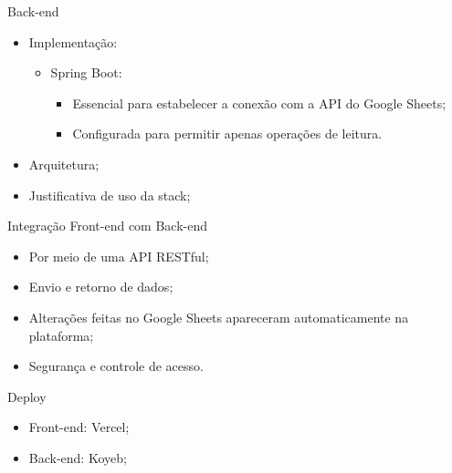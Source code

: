 \begin{frame}{Back-end}
    \begin{itemize}
        \item Implementação: \vspace{0.5cm}
              \begin{itemize}
                  \item Spring Boot: \vspace{0.5cm}
                        \begin{itemize}
                            \item Essencial para estabelecer a conexão com a API do Google Sheets; \vspace{0.5cm}
                            \item Configurada para permitir apenas operações de leitura. \vspace{0.5cm}
                        \end{itemize}
              \end{itemize}
        \item Arquitetura; \vspace{0.5cm}
        \item Justificativa de uso da stack; \vspace{0.5cm}
    \end{itemize}
\end{frame}

\begin{frame}{Integração Front-end com Back-end}
    \begin{itemize}
        \item Por meio de uma API RESTful; \vspace{0.5cm}
        \item Envio e retorno de dados; \vspace{0.5cm}
        \item Alterações feitas no Google Sheets apareceram automaticamente na plataforma; \vspace{0.5cm}
        \item Segurança e controle de acesso. \vspace{0.5cm}
    \end{itemize}
\end{frame}

\begin{frame}{Deploy}
    \begin{itemize}
        \item Front-end: Vercel; \vspace{0.5cm}
        \item Back-end: Koyeb; \vspace{0.5cm}
    \end{itemize}
\end{frame}

